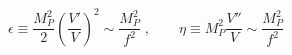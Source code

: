 \begin{equation}
\label{eq:slow}
\epsilon \equiv \frac{M_P^2}{2}\left(\frac{V'}{V}\right)^2 \sim
\frac{M_P^2}{f^2} \;, \qquad \eta \equiv M_P^2 \frac{V''}{V} \sim
\frac{M_P^2}{f^2}
\end{equation}

